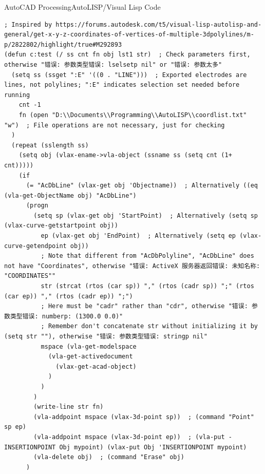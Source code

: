 \documentclass[10pt]{beamer}
\begin{document}
\begin{frame}[fragile]{AutoCAD Processing}{AutoLISP/Visual Lisp Code}
    \begin{verbatim}
; Inspired by https://forums.autodesk.com/t5/visual-lisp-autolisp-and-general/get-x-y-z-coordinates-of-vertices-of-multiple-3dpolylines/m-p/2822802/highlight/true#M292893
(defun c:test (/ ss cnt fn obj lst1 str)  ; Check parameters first, otherwise "错误: 参数类型错误: lselsetp nil" or "错误: 参数太多"
  (setq ss (ssget ":E" '((0 . "LINE")))  ; Exported electrodes are lines, not polylines; ":E" indicates selection set needed before running
    cnt -1
    fn (open "D:\\Documents\\Programming\\AutoLISP\\coordlist.txt" "w")  ; File operations are not necessary, just for checking
  )
  (repeat (sslength ss)
    (setq obj (vlax-ename->vla-object (ssname ss (setq cnt (1+ cnt)))))
    (if
      (= "AcDbLine" (vlax-get obj 'Objectname))  ; Alternatively ((eq (vla-get-ObjectName obj) "AcDbLine")
      (progn
        (setq sp (vlax-get obj 'StartPoint)  ; Alternatively (setq sp (vlax-curve-getstartpoint obj))
          ep (vlax-get obj 'EndPoint)  ; Alternatively (setq ep (vlax-curve-getendpoint obj))
          ; Note that different from "AcDbPolyline", "AcDbLine" does not have "Coordinates", otherwise "错误: ActiveX 服务器返回错误: 未知名称: "COORDINATES""
          str (strcat (rtos (car sp)) "," (rtos (cadr sp)) ";" (rtos (car ep)) "," (rtos (cadr ep)) ";")
          ; Here must be "cadr" rather than "cdr", otherwise "错误: 参数类型错误: numberp: (1300.0 0.0)"
          ; Remember don't concatenate str without initializing it by (setq str ""), otherwise "错误: 参数类型错误: stringp nil"
          mspace (vla-get-modelspace 
            (vla-get-activedocument 
              (vlax-get-acad-object)
            )
          )
        )
        (write-line str fn)
        (vla-addpoint mspace (vlax-3d-point sp))  ; (command "Point" sp ep)
        (vla-addpoint mspace (vlax-3d-point ep))  ; (vla-put -INSERTIONPOINT Obj mypoint) (vlax-put Obj 'INSERTIONPOINT mypoint)
        (vla-delete obj)  ; (command "Erase" obj)
      )
    \end{verbatim}
\end{frame}
\end{document}
